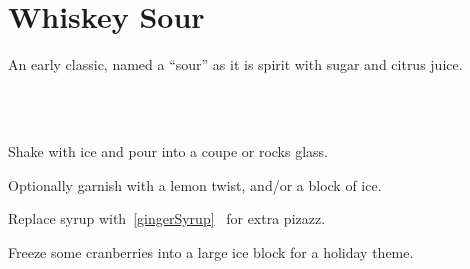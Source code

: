\section[Whiskey Sour]{Whiskey Sour}

\begin{recipestats}[
        servings=1,
        preptime=5~\minute,
        original=\citeauthor{cocktailSeminars2021}~\cite{cocktailSeminars2021},
    ]
\end{recipestats}

\begin{recipeabstract}
    An early classic, named a ``sour'' as it is spirit with sugar and citrus juice.
\end{recipeabstract}

\begin{ingredientcolumns}[1]
    \begin{ingredientblock}
        \\
        \\
    \end{ingredientblock}
\end{ingredientcolumns}

\begin{preparation}
\item Shake with ice and pour into a coupe or rocks glass.
\item Optionally garnish with a lemon twist, and/or a block of ice.
\end{preparation}

\begin{variation}
\item Replace syrup with~\ref{gingerSyrup}~ for extra pizazz.
\item Freeze some cranberries into a large ice block for a holiday theme.
\end{variation}

\recipeend%

